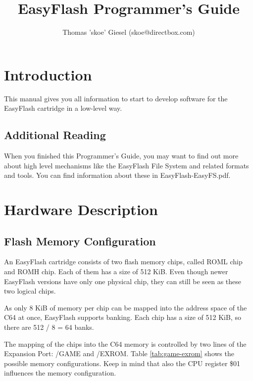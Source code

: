 \documentclass[a4paper,oneside]{memoir}
\title{EasyFlash Programmer's Guide}
\author{
Thomas 'skoe' Giesel
(skoe@directbox.com)
}
\begin{document}
\hsize
\maketitle

\tableofcontents

\chapter{Introduction}

This manual gives you all information to start to develop software for the
EasyFlash cartridge in a low-level way.

\section{Additional Reading}

When you finished this Programmer's Guide, you may want to find out more about
high level mechanisms like the EasyFlash File System and related formats and
tools. You can find information about these in EasyFlash-EasyFS.pdf.

\chapter{Hardware Description}

\section{Flash Memory Configuration}

An EasyFlash cartridge consists of two flash memory chips, called ROML chip and ROMH chip. Each of them has a size of 512 KiB. Even though newer EasyFlash versions have only one physical chip, they can still be seen as these two logical chips.

As only 8 KiB of memory per chip can be mapped into the address space of the C64 at once, EasyFlash supports banking. Each chip has a size of 512 KiB, so there are 512 / 8 = 64 banks.

The mapping of the chips into the C64 memory is controlled by two lines of the Expansion Port: /GAME and /EXROM. Table \ref{tab:game-exrom} shows the possible memory configurations. Keep in mind that also the CPU register \$01 influences the memory configuration.
\end{document}
